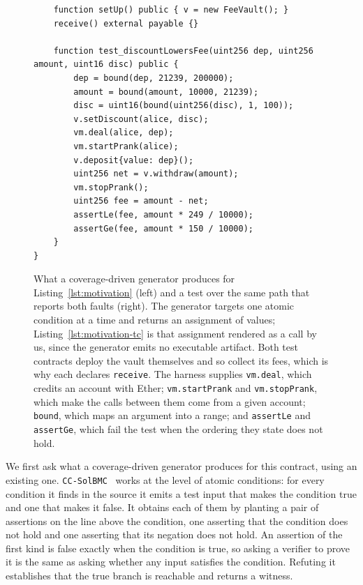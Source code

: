 \documentclass[manuscript,anonymous]{acmart}
\newcommand{\tool}[1]{\texttt{#1}}
\begin{document}
\begin{figure}[t]
\begin{minipage}[t]{0.50\textwidth}
\begin{lstlisting}
    function setUp() public { v = new FeeVault(); }
    receive() external payable {}

    function test_discountLowersFee(uint256 dep, uint256 amount, uint16 disc) public {
        dep = bound(dep, 21239, 200000);
        amount = bound(amount, 10000, 21239);
        disc = uint16(bound(uint256(disc), 1, 100));
        v.setDiscount(alice, disc);
        vm.deal(alice, dep);
        vm.startPrank(alice);
        v.deposit{value: dep}();
        uint256 net = v.withdraw(amount);
        vm.stopPrank();
        uint256 fee = amount - net;
        assertLe(fee, amount * 249 / 10000);
        assertGe(fee, amount * 150 / 10000);
    }
}
\end{lstlisting}
\end{minipage}
\caption{What a coverage-driven generator produces for
Listing~\ref{lst:motivation} (left) and a test over the same path that reports
both faults (right). The generator targets one atomic condition at a time and
returns an assignment of values; Listing~\ref{lst:motivation-tc} is that
assignment rendered as a call by us, since the generator emits no executable
artifact. Both test contracts deploy the vault themselves and so collect its
fees, which is why each declares \texttt{receive}. The harness supplies
\texttt{vm.deal}, which credits an account with Ether;
\texttt{vm.startPrank} and \texttt{vm.stopPrank}, which make the calls between
them come from a given account; \texttt{bound}, which maps an argument into a
range; and \texttt{assertLe} and \texttt{assertGe}, which fail the test when
the ordering they state does not hold.}
\label{fig:motivation-tests}
\end{figure}

We first ask what a coverage-driven generator produces for this contract, using
an existing one. \tool{CC-SolBMC}~\cite{CCSolBMC2024} works at the level of
atomic conditions: for every condition it finds in the source it emits a test
input that makes the condition true and one that makes it false. It obtains
each of them by planting a pair of assertions on the line above the condition,
one asserting that the condition does not hold and one asserting that its
negation does not hold. An assertion of the first kind is false exactly when
the condition is true, so asking a verifier to prove it is the same as asking
whether any input satisfies the condition. Refuting it establishes that the
true branch is reachable and returns a witness.
\end{document}
